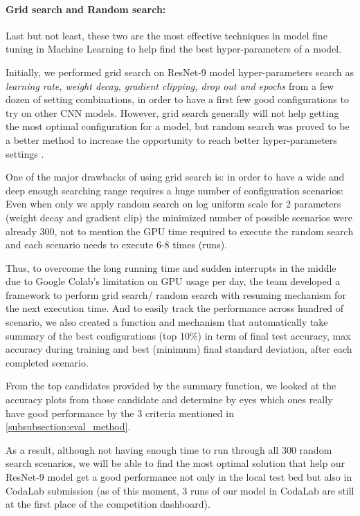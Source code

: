 \documentclass[10pt,twocolumn,letterpaper]{article}
\begin{document}
\paragraph{Grid search and Random search:}
Last but not least, these two are the most effective techniques in model fine tuning in Machine Learning to help find the best hyper-parameters of a model. 

Initially, we performed grid search on ResNet-9 model hyper-parameters search as \textit{learning rate, weight decay, gradient clipping, drop out and epochs} from a few dozen of setting combinations, in order to have a first few good configurations to try on other CNN models. However, grid search generally will not help getting the most optimal configuration for a model, but random search was proved to be a better method to increase the opportunity to reach better hyper-parameters settings \cite{bergstra12a_random_search}. 

One of the major drawbacks of using grid search is: in order to have a wide and deep enough searching range requires a huge number of configuration scenarios:  Even when only we apply random search on log uniform scale for 2 parameters (weight decay and gradient clip) the minimized number of possible scenarios were already 300, not to mention the GPU time required to execute the random search and each scenario needs to execute 6-8 times (runs). 

Thus, to overcome the long running time and sudden interrupts in the middle due to Google Colab's limitation on GPU usage per day, the team developed a framework to perform grid search/ random search with resuming mechanism for the next execution time. And to easily track the performance across hundred of scenario, we also created a function and mechanism that automatically take summary of the best configurations (top 10\%) in term of final test accuracy, max accuracy during training and best (minimum) final standard deviation, after each completed scenario.

From the top candidates provided by the summary function, we looked at the accuracy plots from those candidate and determine by eyes which ones really have good performance by the 3 criteria mentioned in \ref{subsubsection:eval_method}.

As a result, although not having enough time to run through all 300 random search scenarios, we will be able to find the most optimal solution that help our ResNet-9 model get a good performance not only in the local test bed but also in CodaLab submission (as of this moment, 3 runs of our model in CodaLab are still at the first place of the competition dashboard).
\end{document}
